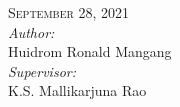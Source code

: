 \documentclass[a4paper,12pt]{article}
\begin{document}
\begin{titlepage}
		\textsc{September 28, 2021}\\[0.5cm] %
		
		
		\large \emph{Author:}\\
		Huidrom Ronald Mangang\\[0.8cm] %
		\large \emph{Supervisor:}\\
		K.S. Mallikarjuna Rao\\[0.8cm] %
		
		
		
		\vfill %
		
	\end{titlepage}
	
	
\end{document}
